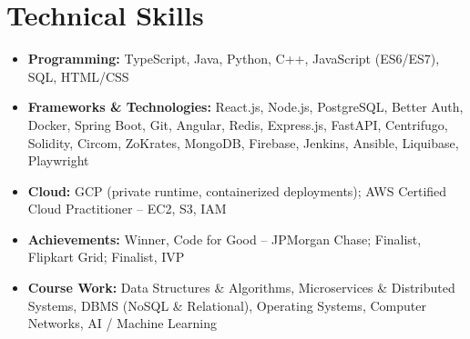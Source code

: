 \documentclass[a4paper,11pt]{article}
\newcommand{\resumeItem}[2]{
  \item{\textbf{#1}{\hspace{0.5mm}#2 \vspace{-0.5mm}}}
}
\newcommand{\resumeSubItem}[2]{\resumeItem{#1}{#2}\vspace{-7pt}}
\newcommand{\resumeHeadingSkillStart}{\begin{itemize}[leftmargin=*,itemsep=0.6mm, rightmargin=2ex]}
\newcommand{\resumeHeadingSkillEnd}{\end{itemize}\vspace{-2mm}}
\begin{document}
\section{\textbf{Technical Skills}}
\vspace{-0.4mm}
\resumeHeadingSkillStart
  \resumeSubItem{Programming: }
    {TypeScript, Java, Python, C++, JavaScript (ES6/ES7), SQL, HTML/CSS}
  \resumeSubItem{Frameworks \& Technologies: }
    {React.js, Node.js, PostgreSQL, Better Auth, Docker, Spring Boot, Git, Angular, Redis, Express.js, FastAPI, Centrifugo, Solidity, Circom, ZoKrates, MongoDB, Firebase, Jenkins, Ansible, Liquibase, Playwright}
  \resumeSubItem{Cloud: }
  {GCP (private runtime, containerized deployments); AWS Certified Cloud Practitioner -- EC2, S3, IAM}
  \resumeSubItem{Achievements: }
    {Winner, Code for Good -- JPMorgan Chase; Finalist, Flipkart Grid; Finalist, IVP}
  \resumeSubItem{Course Work: }
    {Data Structures \& Algorithms, Microservices \& Distributed Systems, DBMS (NoSQL \& Relational), Operating Systems, Computer Networks, AI / Machine Learning}
\resumeHeadingSkillEnd
\end{document}
